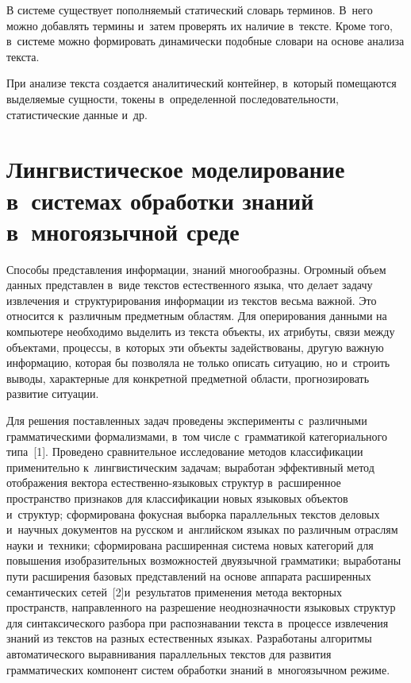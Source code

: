 \begin{multicols}{2}
     В системе существует пополняемый статический словарь терминов. 
В~него можно добавлять термины и~затем проверять их наличие в~тексте. 
Кроме того, в~сис\-те\-ме можно формировать динамически подобные словари 
на основе анализа текста.
     
     При анализе текста создается аналитический контейнер, в~который 
помещаются вы\-де\-ля\-емые сущности, токены в~определенной 
последовательности, статистические данные и~др.
     
    \section{Лингвистическое моделирование в~системах 
обработки знаний в~многоязычной среде}
     
     Способы представления информации, знаний многообразны. Огромный 
объем данных пред\-став\-лен в~виде текс\-тов естественного языка, что делает 
задачу извлечения и~структурирования информации из текстов весьма 
важной. Это относится к~различным предметным областям. Для 
оперирования данными на компьютере необходимо выделить из текста 
объекты, их атрибуты, связи между объектами, процессы, в~которых эти 
объекты задействованы, другую важ\-ную информацию, которая бы позволяла 
не только описать ситуацию, но и~строить выводы, характерные для 
конкретной предметной об\-ласти, прогнозировать развитие ситуации.
     
     Для решения поставленных задач проведены эксперименты 
с~различными грамматическими формализмами, в~том чис\-ле с~грамматикой 
категориального типа~[1]. Проведено сравнительное\linebreak
 исследование методов 
классификации применительно к~лингвистическим задачам; выработан\linebreak 
эффективный метод отображения вектора ес\-те\-ст\-вен\-но-язы\-ко\-вых 
структур в~расширенное пространство признаков для классификации новых 
языковых объектов и~структур; сформирована фокусная выборка 
параллельных текстов деловых и~научных документов на русском 
и~английском языках по различным отраслям науки и~техники;\linebreak 
сформирована расширенная система новых категорий для повышения 
изобразительных возможностей двуязычной грамматики; выработаны пути\linebreak 
расширения базовых представлений на основе аппарата расширенных 
семантических сетей~[2]\linebreak и~результатов применения метода векторных 
пространств, направленного на разрешение не\-од\-но\-знач\-ности языковых 
структур для синтаксического разбора при распознавании текста в~процессе 
извлечения знаний из текстов на разных естественных языках. Разработаны 
алгоритмы автоматического выравнивания параллельных текстов для 
развития грамматических компонент сис\-тем обработки знаний 
в~многоязычном режиме. 


\end{multicols}
